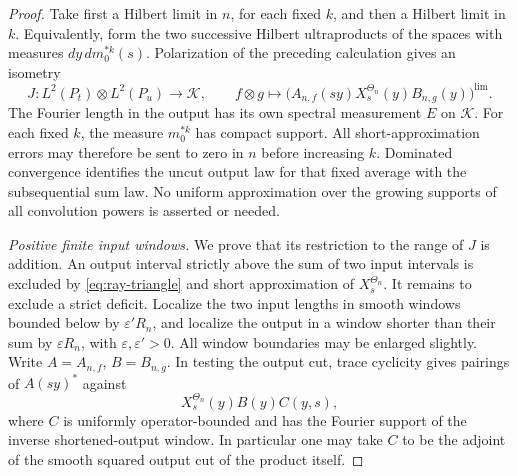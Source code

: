 \begin{proof}
Take first a Hilbert limit in \(n\), for each fixed \(k\), and
then a Hilbert limit in \(k\).  Equivalently, form the two
successive Hilbert ultraproducts of the spaces with measures
\(dy\,dm_0^{*k}(s)\).  Polarization of the preceding calculation
gives an isometry
\begin{equation}
 J:L^2(P_t)\otimes L^2(P_u)\longrightarrow\mathcal K,\qquad
 f\otimes g\longmapsto
 \bigl(A_{n,f}(sy)X^{\Theta_n}_s(y)B_{n,g}(y)\bigr)^{\lim}.
 \label{eq:ray-convolution-link}
\end{equation}
The Fourier length in the output has its own spectral
measurement \(E\) on \(\mathcal K\).
For each fixed \(k\), the measure \(m_0^{*k}\) has compact support.
All short-approximation errors may therefore be sent to zero in
\(n\) before increasing \(k\).  Dominated convergence identifies
the uncut output law for that fixed average with the subsequential
sum law.  No uniform approximation over the growing supports of
all convolution powers is asserted or needed.

\par\smallskip\noindent\textit{Positive finite input windows.}\quad
We prove that its restriction to the range of \(J\) is addition.
An output interval strictly above the sum of two input
intervals is excluded by \eqref{eq:ray-triangle} and short
approximation of \(X^{\Theta_n}_s\).  It remains to exclude a
strict deficit.  Localize the two input lengths in smooth
windows bounded below by \(\varepsilon'R_n\), and localize the
output in a window shorter than their sum by
\(\varepsilon R_n\), with \(\varepsilon,\varepsilon'>0\).
All window boundaries may be enlarged slightly.  Write
\(A=A_{n,f}\), \(B=B_{n,g}\).  In testing the output cut,
trace cyclicity gives pairings of \(A(sy)^*\) against
\[
 X^{\Theta_n}_s(y)B(y)C(y,s),
\]
where \(C\) is uniformly operator-bounded and has the Fourier
support of the inverse shortened-output window.  In particular
one may take \(C\) to be the adjoint of the smooth squared output
cut of the product itself.


\end{proof}
